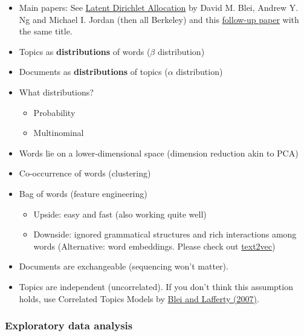 \documentclass[
]{book}
\providecommand{\tightlist}{%
  \setlength{\itemsep}{0pt}\setlength{\parskip}{0pt}}
\begin{document}
\begin{itemize}
\item
  Main papers: See \href{https://proceedings.neurips.cc/paper/2001/file/296472c9542ad4d4788d543508116cbc-Paper.pdf}{Latent Dirichlet Allocation} by David M. Blei, Andrew Y. Ng and Michael I. Jordan (then all Berkeley) and this \href{http://www.cse.cuhk.edu.hk/irwin.king/_media/presentations/latent_dirichlet_allocation.pdf}{follow-up paper} with the same title.
\item
  Topics as \textbf{distributions} of words (\(\beta\) distribution)
\item
  Documents as \textbf{distributions} of topics (\(\alpha\) distribution)
\item
  What distributions?

  \begin{itemize}
  \item
    Probability
  \item
    Multinominal
  \end{itemize}
\item
  Words lie on a lower-dimensional space (dimension reduction akin to PCA)
\item
  Co-occurrence of words (clustering)
\item
  Bag of words (feature engineering)

  \begin{itemize}
  \tightlist
  \item
    Upside: easy and fast (also working quite well)
  \item
    Downside: ignored grammatical structures and rich interactions among words (Alternative: word embeddings. Please check out \href{http://text2vec.org/}{text2vec})
  \end{itemize}
\item
  Documents are exchangeable (sequencing won't matter).
\item
  Topics are independent (uncorrelated). If you don't think this assumption holds, use Correlated Topics Models by \href{https://arxiv.org/pdf/0708.3601.pdf\#:~:text=The\%20correlated\%20topic\%20model\%20(CTM)\%20is\%20a\%20hierarchical\%20model\%20of,are\%20document\%2D\%20specific\%20random\%20variables.}{Blei and Lafferty (2007)}.
\end{itemize}

\hypertarget{exploratory-data-analysis}{%
\subsubsection{Exploratory data analysis}\label{exploratory-data-analysis}}
\end{document}
